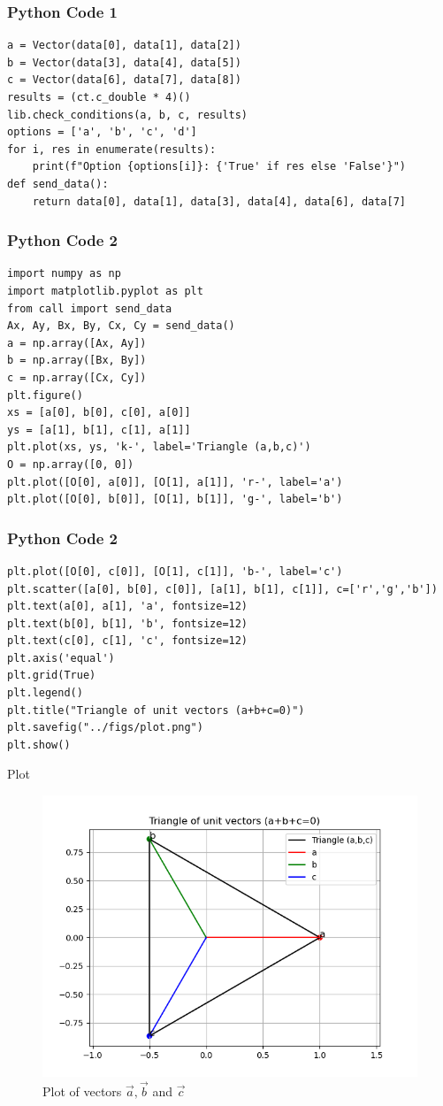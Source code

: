 \documentclass{beamer}
\begin{document}
\begin{frame}[fragile]
    \frametitle{Python Code 1}
    \begin{lstlisting}
a = Vector(data[0], data[1], data[2])
b = Vector(data[3], data[4], data[5])
c = Vector(data[6], data[7], data[8])
results = (ct.c_double * 4)()
lib.check_conditions(a, b, c, results)
options = ['a', 'b', 'c', 'd']
for i, res in enumerate(results):
    print(f"Option {options[i]}: {'True' if res else 'False'}")
def send_data():
    return data[0], data[1], data[3], data[4], data[6], data[7]
    \end{lstlisting}
\end{frame}

\begin{frame}[fragile]
    \frametitle{Python Code 2}
    \begin{lstlisting}
import numpy as np
import matplotlib.pyplot as plt
from call import send_data
Ax, Ay, Bx, By, Cx, Cy = send_data()
a = np.array([Ax, Ay])                         
b = np.array([Bx, By])           
c = np.array([Cx, Cy])          
plt.figure()
xs = [a[0], b[0], c[0], a[0]]
ys = [a[1], b[1], c[1], a[1]]
plt.plot(xs, ys, 'k-', label='Triangle (a,b,c)')
O = np.array([0, 0])
plt.plot([O[0], a[0]], [O[1], a[1]], 'r-', label='a')
plt.plot([O[0], b[0]], [O[1], b[1]], 'g-', label='b')
    \end{lstlisting}
\end{frame}

\begin{frame}[fragile]
    \frametitle{Python Code 2}
    \begin{lstlisting}
plt.plot([O[0], c[0]], [O[1], c[1]], 'b-', label='c')
plt.scatter([a[0], b[0], c[0]], [a[1], b[1], c[1]], c=['r','g','b'])
plt.text(a[0], a[1], 'a', fontsize=12)
plt.text(b[0], b[1], 'b', fontsize=12)
plt.text(c[0], c[1], 'c', fontsize=12)
plt.axis('equal')
plt.grid(True)
plt.legend()
plt.title("Triangle of unit vectors (a+b+c=0)")
plt.savefig("../figs/plot.png")
plt.show()

    \end{lstlisting}
\end{frame}

\begin{frame}{Plot}
    \begin{figure}
        \centering
        \includegraphics[width=0.5\columnwidth]{../figs/plot.png}
        \caption{Plot of vectors $\vec{a}, \vec{b}$ and $\vec{c}$}
        \label{fig:fig}
    \end{figure}
\end{frame}
\end{document}
